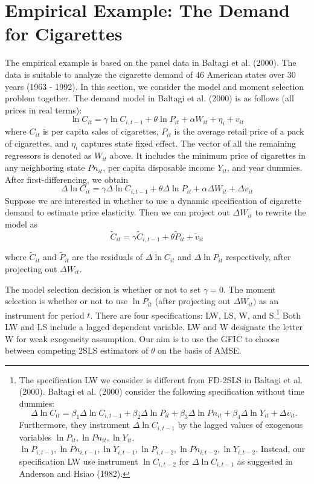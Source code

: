\section{Empirical Example: The Demand for Cigarettes}
\label{sec:empirical}

The empirical example is based on the panel data in Baltagi et al. (2000). The data is suitable to analyze the cigarette demand of 46 American states over 30 years (1963 - 1992). In this section, we consider the model and moment selection problem together. The demand model in Baltagi et al. (2000) is as follows (all prices in real terms): 
\[
\ln C_{it} =  \gamma \ln C_{i,t-1} + \theta \ln P_{it} + \alpha W_{it} + \eta_i +  v_{it}
\] 
where $C_{it}$ is per capita sales of cigarettes, $P_{it}$ is the average retail price of a pack of cigarettes, and $\eta_i$ captures state fixed effect. The vector of all the remaining regressors is denoted as $W_{it}$ above. It includes the minimum price of cigarettes in any neighboring state $Pn_{it}$, per capita disposable income $Y_{it}$, and year dummies. After first-differencing, we obtain 
\[
\Delta \ln C_{it} = \gamma \Delta \ln C_{i,t-1} +  \theta \Delta \ln P_{it} +\alpha \Delta W_{it} +  \Delta v_{it}
\]
 Suppose we are interested in whether to use a dynamic specification of cigarette demand to estimate price elasticity. Then we can project out $\Delta W_{it}$ to rewrite the model as
\[
\widetilde{C}_{it} = \gamma \widetilde{C}_{i,t-1} + \theta \widetilde{P}_{it} + \widetilde{v}_{it} 
\] 
 
 where $\widetilde{C}_{it}$ and $\widetilde{P}_{it}$ are the residuals of $\Delta \ln C_{it}$ and $\Delta \ln P_{it}$ respectively, after projecting out $\Delta W_{it}$.
 
The model selection decision is whether or not to set $\gamma = 0$. The moment selection is whether or not to use $\ln P_{it}$ (after projecting out $\Delta W_{it})$ as an instrument for period $t$.  There are four specifications:  LW, LS, W, and S.\footnote{The specification LW we consider is different from FD-2SLS in Baltagi et al. (2000). Baltagi et al. (2000) consider the following specification without time dummies:
 \[
\Delta \ln C_{it} = \beta_1 \Delta \ln C_{i,t-1} +  \beta_2 \Delta \ln P_{it} +\beta_3 \Delta \ln Pn_{it} +  \beta_4 \Delta \ln Y_{it} + \Delta v_{it}.
\]
Furthermore, they instrument $\Delta \ln C_{i,t-1}$ by the lagged values of exogenous variables $\ln P_{it}, \ln Pn_{it}, \ln Y_{it},$ $\ln P_{i,t-1}, \ln Pn_{i,t-1}, \ln Y_{i,t-1}, \ln P_{i,t-2}, \ln Pn_{i,t-2}, \ln Y_{i,t-2}$. Instead, our specification LW use instrument $\ln C_{i, t-2}$ for $\Delta \ln C_{i,t-1}$ as suggested in Anderson and Hsiao (1982).}
 Both LW and LS include a lagged dependent variable. LW and W designate the letter W for weak exogeneity assumption. Our aim is to use the GFIC to choose between competing 2SLS estimators of $\theta$ on the basis of AMSE. %
\newpage


